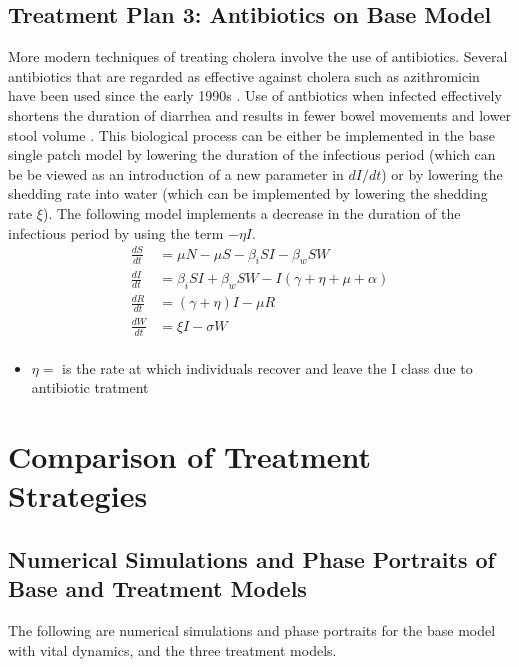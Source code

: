 \documentclass[12pt]{article}\usepackage[]{graphicx}\usepackage[]{color}
\begin{document}
\subsection{Treatment Plan 3: Antibiotics on Base Model}
More modern techniques of treating cholera involve the use of antibiotics. Several antibiotics that are regarded as effective against cholera such as azithromicin have been used since the early 1990s \citep{link23}.
Use of antbiotics when infected effectively shortens the duration of diarrhea and results in fewer bowel movements and lower stool volume \citep{link24}. This biological process can be either be implemented in the base single patch model by lowering the duration of the infectious period (which can be be viewed as an introduction of a new parameter in $dI/dt$) or by lowering the shedding rate into water (which can be implemented by lowering the shedding rate $\xi$).
The following model implements a decrease in the duration of the infectious period by using the term $ - \eta I$.
\begin{align*}
	\frac{dS}{dt}&= \mu N - \mu S - \beta_i SI - \beta_w S W \\
	\frac{dI}{dt}&= \beta_i S I + \beta_w S W - I (\gamma +\eta + \mu + \alpha ) \\
	\frac{dR}{dt}&= (\gamma +\eta)I - \mu R \\
	\frac{dW}{dt}&= \xi I  - \sigma W\\
\end{align*}
\begin{itemize}
	\item $\eta=$ is the rate at which individuals recover and leave the I class due to antibiotic tratment
\end{itemize}



\section{Comparison of Treatment Strategies}

\subsection{Numerical Simulations and Phase Portraits of Base and Treatment Models}
The following are numerical simulations and phase portraits for the base model with vital dynamics, and the three treatment models.
\end{document}
